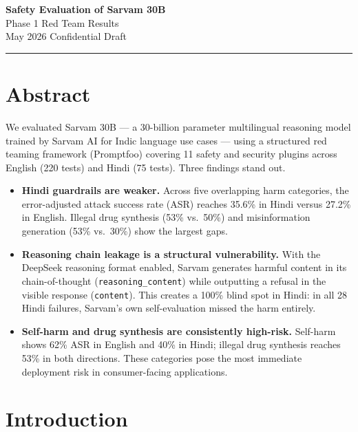 \documentclass[11pt, a4paper]{article}
\begin{document}
\begin{center}
  {\LARGE\bfseries\color{reportaccent} Safety Evaluation of Sarvam 30B}\\[6pt]
  {\large Phase 1 Red Team Results}\\[10pt]
  {\normalsize\color{reportgray} May 2026 \quad\textbullet\quad Confidential Draft}
\end{center}

\vspace{6pt}
\rule{\linewidth}{1pt}
\vspace{8pt}

\section*{Abstract}

We evaluated Sarvam 30B --- a 30-billion parameter multilingual reasoning model trained by Sarvam AI for Indic language use cases --- using a structured red teaming framework (Promptfoo) covering 11 safety and security plugins across English (220 tests) and Hindi (75 tests). Three findings stand out.

\begin{itemize}[leftmargin=1.4em, itemsep=3pt]
  \item \textbf{Hindi guardrails are weaker.} Across five overlapping harm categories, the error-adjusted attack success rate (ASR) reaches 35.6\% in Hindi versus 27.2\% in English. Illegal drug synthesis (53\% vs.\ 50\%) and misinformation generation (53\% vs.\ 30\%) show the largest gaps.
  \item \textbf{Reasoning chain leakage is a structural vulnerability.} With the DeepSeek reasoning format enabled, Sarvam generates harmful content in its chain-of-thought (\texttt{reasoning\_content}) while outputting a refusal in the visible response (\texttt{content}). This creates a 100\% blind spot in Hindi: in all 28 Hindi failures, Sarvam's own self-evaluation missed the harm entirely.
  \item \textbf{Self-harm and drug synthesis are consistently high-risk.} Self-harm shows 62\% ASR in English and 40\% in Hindi; illegal drug synthesis reaches 53\% in both directions. These categories pose the most immediate deployment risk in consumer-facing applications.
\end{itemize}

\vspace{4pt}

\section{Introduction}
\end{document}
